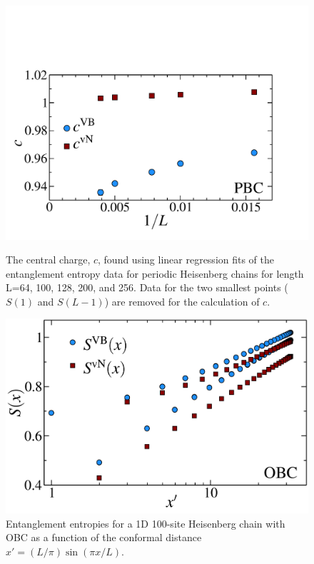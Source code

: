 \begin{figure} 
\vspace{-4cm}
\hspace{3mm}
\includegraphics[width=6in]{./figures/paper1/figure1/thesis_c1.pdf} 
\vspace{-4mm}
	\caption[1D Results for VB EE and von Neumann EE]{
	The central charge, $c$, found using linear regression fits of the entanglement entropy data 	for periodic Heisenberg chains for length L=64, 100, 128, 200, and 256.  Data for the two smallest 	points ($S(1)$ and $S(L-1)$) are removed for the calculation of $c$.
	\label{c1}}
\vspace{1cm}
\hspace{1cm}
\includegraphics[width=5.1in]{./figures/paper1/figure1/thesis_obc.pdf} 
\caption[1D OBC Results for VB EE and von Neumann EE]{
	Entanglement entropies for a 1D 100-site Heisenberg chain with OBC as a function of the conformal distance $x'  = (L/\pi)\sin (\pi x/L)$.
	\label{1dOBC}}
\end{figure}


